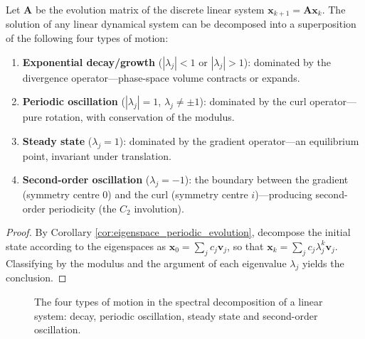 \begin{corollary}\label{cor:linear_system_spectral_period}
Let $\mathbf{A}$ be the evolution matrix of the discrete linear system $\mathbf{x}_{k+1} = \mathbf{A}\mathbf{x}_k$. The solution of any linear dynamical system can be decomposed into a superposition of the following four types of motion:
\begin{enumerate}[label=(\roman*)]
    \item \textbf{Exponential decay/growth} ($|\lambda_j| < 1$ or $|\lambda_j| > 1$): dominated by the divergence operator---phase-space volume contracts or expands.
    \item \textbf{Periodic oscillation} ($|\lambda_j| = 1$, $\lambda_j \neq \pm 1$): dominated by the curl operator---pure rotation, with conservation of the modulus.
    \item \textbf{Steady state} ($\lambda_j = 1$): dominated by the gradient operator---an equilibrium point, invariant under translation.
    \item \textbf{Second-order oscillation} ($\lambda_j = -1$): the boundary between the gradient (symmetry centre $0$) and the curl (symmetry centre $i$)---producing second-order periodicity (the $C_2$ involution).
\end{enumerate}
\end{corollary}

\begin{proof}
By Corollary \ref{cor:eigenspace_periodic_evolution}, decompose the initial state according to the eigenspaces as $\mathbf{x}_0 = \sum_j c_j \mathbf{v}_j$, so that $\mathbf{x}_k = \sum_j c_j \lambda_j^k \mathbf{v}_j$. Classifying by the modulus and the argument of each eigenvalue $\lambda_j$ yields the conclusion.
\end{proof}

\begin{figure}[htbp]
\centering
{}
\caption{The four types of motion in the spectral decomposition of a linear system: decay, periodic oscillation, steady state and second-order oscillation.}
\label{fig:linear_system_spectral}
\end{figure}

